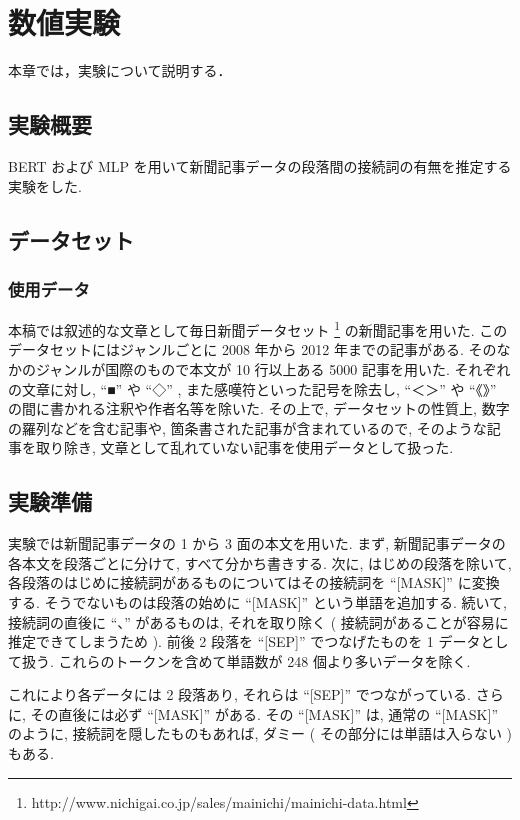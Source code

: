 \newpage
\changeindent{0cm}
\section{数値実験}
\changeindent{2cm}
本章では，実験について説明する．
\subsection{実験概要}
BERT および MLP を用いて新聞記事データの段落間の接続詞の有無を推定する実験をした.
\changeindent{0cm}
\subsection{データセット}
\subsubsection{使用データ}
本稿では叙述的な文章として毎日新聞データセット
\footnote{
http:\slash\slash{}www.nichigai.co.jp\slash{}sales\slash{}mainichi\slash{}mainichi-data.html
}
の新聞記事を用いた.
このデータセットにはジャンルごとに 2008 年から 2012 年までの記事がある.
そのなかのジャンルが国際のもので本文が 10 行以上ある 5000 記事を用いた.
それぞれの文章に対し, ``■'' や ``◇'' , また感嘆符といった記号を除去し,
``＜＞'' や ``《》'' の間に書かれる注釈や作者名等を除いた.
その上で, データセットの性質上, 数字の羅列などを含む記事や, 箇条書された記事が含まれているので,
そのような記事を取り除き, 文章として乱れていない記事を使用データとして扱った.

\subsection{実験準備}
実験では新聞記事データの 1 から 3 面の本文を用いた.
まず, 新聞記事データの各本文を段落ごとに分けて, すべて分かち書きする.
次に, はじめの段落を除いて, 各段落のはじめに接続詞があるものについてはその接続詞を ``[MASK]''
に変換する. そうでないものは段落の始めに ``[MASK]'' という単語を追加する.
続いて, 接続詞の直後に ``、'' があるものは, それを取り除く ( 接続詞があることが容易に推定できてしまうため ).
前後 2 段落を ``[SEP]'' でつなげたものを 1 データとして扱う. これらのトークンを含めて単語数が 248 個より多いデータを除く. \par
これにより各データには 2 段落あり, それらは ``[SEP]'' でつながっている. さらに, その直後には必ず ``[MASK]'' がある.
その ``[MASK]'' は, 通常の ``[MASK]'' のように, 接続詞を隠したものもあれば, ダミー ( その部分には単語は入らない ) もある.
